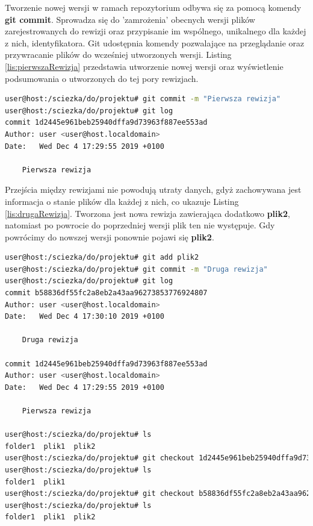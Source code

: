 Tworzenie nowej wersji w ramach repozytorium odbywa się za pomocą komendy \textbf{git commit}. Sprowadza się do 'zamrożenia' obecnych wersji plików zarejestrowanych do rewizji oraz przypisanie im wspólnego, unikalnego dla każdej z nich, identyfikatora. Git udostępnia komendy pozwalające na przeglądanie oraz przywracanie plików do wcześniej utworzonych wersji. Listing \ref{lis:pierwszaRewizja} przedstawia utworzenie nowej wersji oraz wyświetlenie podsumowania o utworzonych do tej pory rewizjach.

\begin{lstlisting}[label={lis:pierwszaRewizja}, language=bash,caption={Utworzenie nowej rewizji}]
user@host:/sciezka/do/projektu# git commit -m "Pierwsza rewizja"
user@host:/sciezka/do/projektu# git log 
commit 1d2445e961beb25940dffa9d73963f887ee553ad
Author: user <user@host.localdomain>
Date:   Wed Dec 4 17:29:55 2019 +0100

    Pierwsza rewizja
\end{lstlisting}

Przejścia między rewizjami nie powodują utraty danych, gdyż zachowywana jest informacja o stanie plików dla każdej z nich, co ukazuje Listing \ref{lis:drugaRewizja}. Tworzona jest nowa rewizja zawierająca dodatkowo \textbf{plik2}, natomiast po powrocie do poprzedniej wersji plik ten nie występuje. Gdy powrócimy do nowszej wersji ponownie pojawi się \textbf{plik2}.

\begin{lstlisting}[label={lis:drugaRewizja}, language=bash,caption={Podsumowanie rewizji, powrót do starszej wersji}]
user@host:/sciezka/do/projektu# git add plik2
user@host:/sciezka/do/projektu# git commit -m "Druga rewizja"
user@host:/sciezka/do/projektu# git log 
commit b58836df55fc2a8eb2a43aa96273853776924807
Author: user <user@host.localdomain>
Date:   Wed Dec 4 17:30:10 2019 +0100

    Druga rewizja

commit 1d2445e961beb25940dffa9d73963f887ee553ad
Author: user <user@host.localdomain>
Date:   Wed Dec 4 17:29:55 2019 +0100

    Pierwsza rewizja

user@host:/sciezka/do/projektu# ls
folder1  plik1  plik2
user@host:/sciezka/do/projektu# git checkout 1d2445e961beb25940dffa9d73963f887ee553ad
user@host:/sciezka/do/projektu# ls
folder1  plik1
user@host:/sciezka/do/projektu# git checkout b58836df55fc2a8eb2a43aa96273853776924807
user@host:/sciezka/do/projektu# ls
folder1  plik1  plik2
\end{lstlisting}

